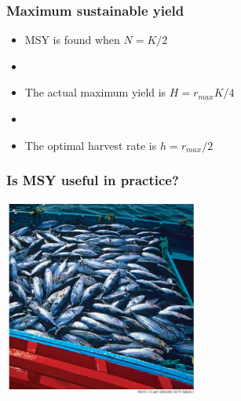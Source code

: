 \documentclass[color=usenames,dvipsnames]{beamer}\usepackage[]{graphicx}\usepackage[]{xcolor}
\begin{document}
\begin{frame}
  \frametitle{Maximum sustainable yield}
  \Large
  \begin{itemize}
    \item MSY is found when $N=K/2$
    \item[]
    \item The actual maximum yield is $H = r_{max}K/4$
    \item[]
    \item The optimal harvest rate is $h = r_{max}/2$
  \end{itemize}
\end{frame}








\begin{frame}
  \frametitle{Is MSY useful in practice?}
  \begin{center}
 \includegraphics[height=6.5cm,keepaspectratio]{figs/tuna}
  \end{center}
\end{frame}
\end{document}
